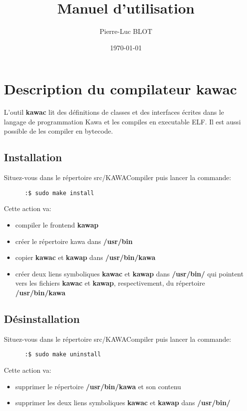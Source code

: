 \documentclass{../res/univ-projet}
\title{Manuel d'utilisation}
\author{Pierre-Luc BLOT}
\date{\today}
\begin{document}
\maketitle
\newpage
\tableofcontents
\newpage

\section{Description du compilateur kawac} 
L'outil \textbf{kawac} lit des définitions de classes et des interfaces écrites dans le
langage de programmation Kawa et les compiles en executable ELF. Il est aussi
possible de les compiler en bytecode.

  \subsection{Installation}
    Situez-vous dans le répertoire src/KAWACompiler puis lancer la commande:
    \begin{verbatim}
      :$ sudo make install
    \end{verbatim}

    Cette action va:
    \begin{itemize}
      \item compiler le frontend \textbf{kawap}
      \item créer le répertoire kawa dans \textbf{/usr/bin}
      \item copier \textbf{kawac} et \textbf{kawap} dans \textbf{/usr/bin/kawa}
      \item créer deux liens symboliques \textbf{kawac} et \textbf{kawap} dans \textbf{/usr/bin/} qui pointent vers les fichiers \textbf{kawac} et \textbf{kawap}, respectivement, du répertoire \textbf{/usr/bin/kawa}

    \end{itemize}

  \subsection{Désinstallation}
    Situez-vous dans le répertoire src/KAWACompiler puis lancer la commande:
    \begin{verbatim}
      :$ sudo make uninstall
    \end{verbatim}

    Cette action va:
    \begin{itemize}
      
      \item supprimer le répertoire \textbf{/usr/bin/kawa} et son contenu
      
      \item supprimer les deux liens symboliques \textbf{kawac} et \textbf{kawap} dans \textbf{/usr/bin/} 

    \end{itemize}
\end{document}
